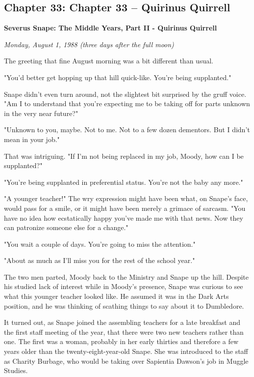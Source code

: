 \documentclass[a4paper,11pt]{article}
\begin{document}
\subsection{Chapter 33: Chapter 33 – Quirinus Quirrell}

\textbf{Severus Snape: The Middle Years, Part II - Quirinus Quirrell}

\emph{Monday, August 1, 1988 (three days after the full moon)}

The greeting that fine August morning was a bit different than usual.

"You'd better get hopping up that hill quick-like. You're being supplanted."

Snape didn't even turn around, not the slightest bit surprised by the gruff voice. "Am I to understand that you're expecting me to be taking off for parts unknown in the very near future?"

"Unknown to you, maybe. Not to me. Not to a few dozen dementors. But I didn't mean in your job."

That was intriguing. "If I'm not being replaced in my job, Moody, how can I be supplanted?"

"You're being supplanted in preferential status. You're not the baby any more."

"A younger teacher!" The wry expression might have been what, on Snape's face, would pass for a smile, or it might have been merely a grimace of sarcasm. "You have no idea how ecstatically happy you've made me with that news. Now they can patronize someone else for a change."

"You wait a couple of days. You're going to miss the attention."

"About as much as I'll miss you for the rest of the school year."

The two men parted, Moody back to the Ministry and Snape up the hill. Despite his studied lack of interest while in Moody's presence, Snape was curious to see what this younger teacher looked like. He assumed it was in the Dark Arts position, and he was thinking of scathing things to say about it to Dumbledore.

It turned out, as Snape joined the assembling teachers for a late breakfast and the first staff meeting of the year, that there were two new teachers rather than one. The first was a woman, probably in her early thirties and therefore a few years older than the twenty-eight-year-old Snape. She was introduced to the staff as Charity Burbage, who would be taking over Sapientia Dawson's job in Muggle Studies.
\end{document}
